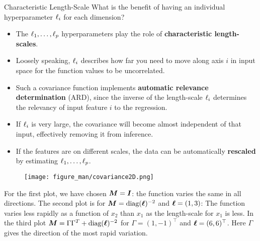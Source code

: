 \begin{frame}[c,allowframebreaks]{Characteristic Length-Scale}
What is the benefit of having an individual hyperparameter $\ell_i$ for each dimension?

\vspace{4mm}

\begin{itemize} 
\item The $\ell_1,\dots, \ell_p$ hyperparameters play the role of \textbf{characteristic length-scales}.
\vspace{2mm}
\item Loosely speaking, $\ell_i$ describes how far you need to move along axis $i$ in input space for the function values to be uncorrelated.
\vspace{2mm}
\item Such a covariance function implements \textbf{automatic relevance determination} (ARD), since the inverse of the length-scale $\ell_i$ determines the relevancy of input feature $i$ to the regression.
\vspace{2mm}
\item If $\ell_i$ is very large, the covariance will become almost independent of that input, effectively removing it from inference.
\vspace{2mm}
\item If the features are on different scales, the data can be automatically \textbf{rescaled} by estimating $\ell_1,\dots, \ell_p$. 

\end{itemize}



\framebreak


\begin{figure}
	\texttt{[image: figure\_man/covariance2D.png]}
\end{figure}

\vspace{3mm}
For the first plot, we have chosen $\bm{M} = \boldsymbol{I}$: the function varies the same in all directions. The second plot is for $\bm{M} = \text{diag}(\bm{\ell})^{-2}$ and $\bm{\ell} = \left(1, 3 \right)$: The function varies less rapidly as a function of $x_2$ than $x_1$ as the length-scale for $x_1$ is less. In the third plot $\bm{M} = \Gamma \Gamma^T + \text{diag}(\bm{\ell})^{-2}$ for $\Gamma = (1, -1)^\top$ and $\bm{\ell} = (6, 6)^\top$. Here $\Gamma$ gives the direction of the most rapid variation. 


\end{frame}



